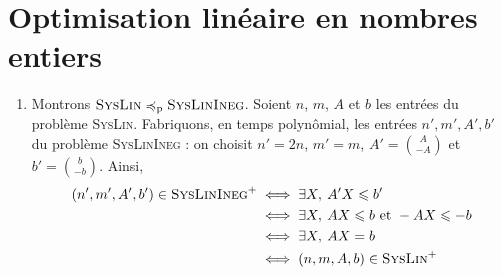 \section{Optimisation linéaire en nombres entiers}

\begin{enumerate}
	\item Montrons $\textsc{SysLin} \preceq_\mathrm{p} \textsc{SysLinIneg}$. Soient $n$, $m$, $A$\/ et $b$\/ les entrées du problème \textsc{SysLin}.
		Fabriquons, en temps polynômial, les entrées $n',m',A', b'$\/ du problème \textsc{SysLinIneg} : on choisit $n' = 2n$, $m' = m$, $A' = {A \choose -A}$\/ et $b' = {b\choose -b}$.
		Ainsi,
		\begin{align*}
			(n',m',A',b') \in \textsc{SysLinIneg}^+
			&\iff \exists X,\: A'X \le b'\\
			&\iff \exists X,\: AX \le b \text{ et } -AX \le -b\\
			&\iff \exists X,\: AX = b\\
			&\iff (n,m,A,b) \in \textsc{SysLin}^+
		\end{align*}
\end{enumerate}

